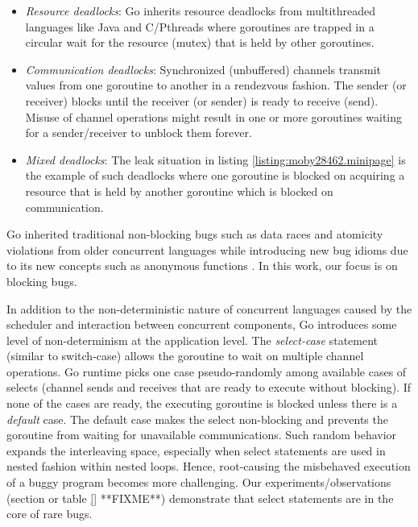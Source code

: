 \begin{itemize}
  \item \textit{Resource deadlocks}: Go inherits resource deadlocks from multithreaded languages like Java and C/Pthreads where goroutines are trapped in a circular wait for the resource (\eg mutex) that is held by other goroutines.
  \item \textit{Communication deadlocks}: Synchronized (unbuffered) channels transmit values from one goroutine to another in a rendezvous fashion. The sender (or receiver) blocks until the receiver (or sender) is ready to receive (send). Misuse of channel operations might result in one or more goroutines waiting for a sender/receiver to unblock them forever.
  \item \textit{Mixed deadlocks}: The leak situation in listing \ref{listing:moby28462.minipage} is the example of such deadlocks where one goroutine is blocked on acquiring a resource that is held by another goroutine which is blocked on communication.
\end{itemize}
Go inherited traditional non-blocking bugs such as data races and atomicity violations from older concurrent languages while introducing new bug idioms due to its new concepts such as anonymous functions \cite{tu-concurrentBugs-asplos19}.
%
In this work, our focus is on blocking bugs.

%
In addition to the non-deterministic nature of concurrent languages caused by the scheduler and interaction between concurrent components, Go introduces some level of non-determinism at the application level.
%
The \textit{select-case} statement (similar to switch-case) allows the goroutine to wait on multiple channel operations.
%
Go runtime picks one case pseudo-randomly among available cases of selects (\ie channel sends and receives that are ready to execute without blocking).
%
If none of the cases are ready, the executing goroutine is blocked unless there is a \textit{default} case.
%
The default case makes the select non-blocking and prevents the goroutine from waiting for unavailable communications.
%
Such random behavior expands the interleaving space, especially when select statements are used in nested fashion within nested loops.
%
Hence, root-causing the misbehaved execution of a buggy program becomes more challenging.
%
Our experiments/observations (section or table \ref{} **FIXME**) demonstrate that select statements are in the core of rare bugs.


